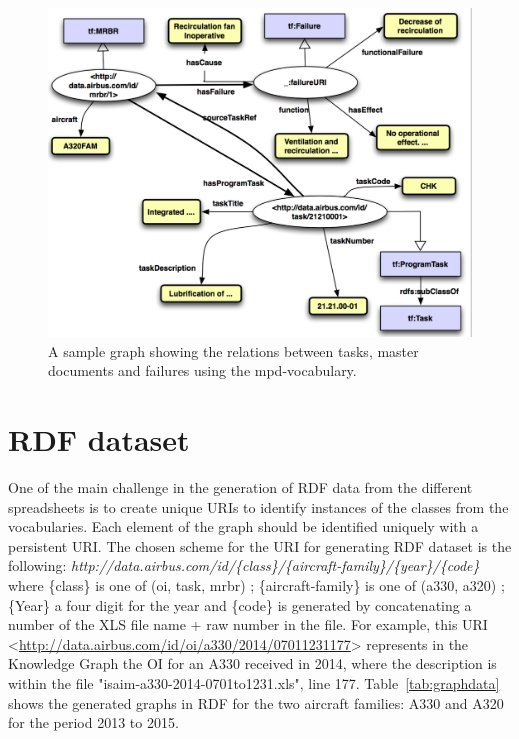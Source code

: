 \documentclass[a4paper,english,submission]{rnti}  %
\begin{document}
\begin{figure}[!htb]
\centering
\includegraphics[scale=0.4]{img/task-mpd-graph.png}
\caption{A sample graph showing the relations between tasks, master documents and failures using the mpd-vocabulary.}
\label{figtaskresource}
\end{figure}


\section{RDF dataset}
\label{sec:a330rdf}
One of the main challenge in the generation of RDF data from the different spreadsheets is to create unique URIs to identify instances of the classes from the vocabularies. Each element of the graph should be identified uniquely with a persistent URI. The chosen scheme for the URI for generating RDF dataset is the following:
\textit{http://data.airbus.com/id/\{class\}/\{aircraft-family\}/\{year\}/\{code\}} \\
where \{class\} is one of (oi, task, mrbr) ; \{aircraft-family\} is one of (a330, a320) ; \{Year\} a four digit for the year and \{code\} is generated by concatenating a number of the XLS file name + raw number in the file. For example, this URI <\url{http://data.airbus.com/id/oi/a330/2014/07011231177}> represents in the Knowledge Graph the OI for an A330 received in 2014, where the description is within the file "isaim-a330-2014-0701to1231.xls", line 177. Table~\ref{tab:graphdata} shows the generated graphs in RDF for the two aircraft families: A330 and A320 for the period 2013 to 2015. 
\end{document}
